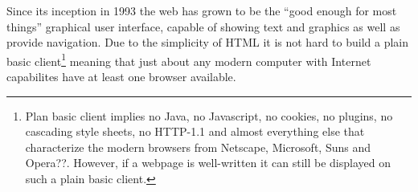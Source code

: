 Since its inception in 1993 the web has grown to be the ``good enough
for most things'' graphical user interface, capable of showing text
and graphics as well as provide navigation.  Due to the simplicity of
HTML it is not hard to build a plain basic client\footnote{Plan basic
  client implies no Java, no Javascript, no cookies, no plugins, no
  cascading style sheets, no HTTP-1.1 and almost everything else that
  characterize the modern browsers from Netscape, Microsoft, Suns and
  Opera\textsf{??}.  However, if a webpage is well-written it can
  still be displayed on such a plain basic client. } meaning that just
about any modern computer with Internet capabilites have at least one
browser available.









